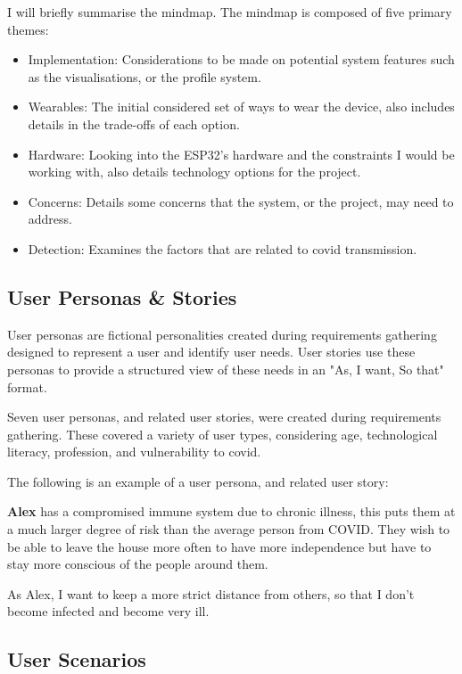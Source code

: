 \documentclass{l4proj}
\begin{document}
I will briefly summarise the mindmap. The mindmap is composed of five primary themes:
\begin{itemize}
    \item Implementation: Considerations to be made on potential system features such as the visualisations, or the profile system.
    \item Wearables: The initial considered set of ways to wear the device, also includes details in the trade-offs of each option.
    \item Hardware: Looking into the ESP32's hardware and the constraints I would be working with, also details technology options for the project.
    \item Concerns: Details some concerns that the system, or the project, may need to address.
    \item Detection: Examines the factors that are related to covid transmission.
\end{itemize}

\subsection{User Personas \& Stories}

User personas are fictional personalities created during requirements gathering designed to represent a user and identify user needs. User stories use these personas to provide a structured view of these needs in an "As, I want, So that" format.

Seven user personas, and related user stories, were created during requirements gathering. These covered a variety of user types, considering age, technological literacy, profession, and vulnerability to covid.

The following is an example of a user persona, and related user story:

\textbf{Alex} has a compromised immune system due to chronic illness, this puts them at a much larger degree of risk than the average person from COVID. They wish to be able to leave the house more often to have more independence but have to stay more conscious of the people around them.

As Alex, I want to keep a more strict distance from others, so that I don't become infected and become very ill.

\subsection{User Scenarios}
\end{document}
